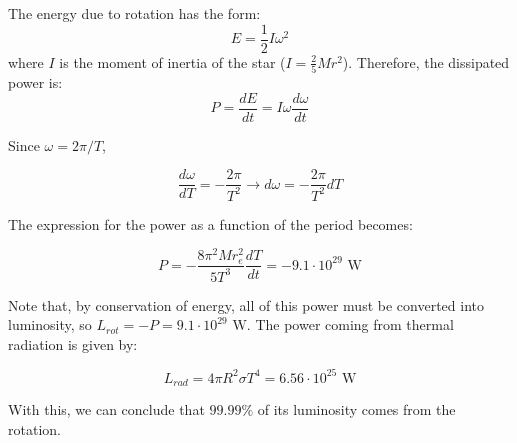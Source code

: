 \documentclass[11pt]{article}
\begin{document}
\begin{pproblem}
\begin{pssolution*}{}{}
\begin{alternativas}
            \item The energy due to rotation has the form:
            \[E = \frac{1}{2}I\omega^2\]
            where \(I\) is the moment of inertia of the star (\(I = \frac{2}{5}Mr^2\)). Therefore, the dissipated power is:
            \[P = \frac{dE}{dt} = I\omega\frac{d\omega}{dt}\]

            Since \(\omega = 2\pi/T\),

            \[\frac{d\omega}{dT} = -\frac{2\pi}{T^2} \rightarrow d\omega = -\frac{2\pi}{T^2}dT\]
            
            The expression for the power as a function of the period becomes:

            \[P = -\frac{8\pi^2Mr_e^2}{5T^3}\frac{dT}{dt} = -9.1\cdot10^{29} \text{ W}\]

            Note that, by conservation of energy, all of this power must be converted into luminosity, so \(L_{rot} = -P = 9.1\cdot10^{29}\text{ W}\). The power coming from thermal radiation is given by:

            \[L_{rad} = 4\pi R^2\sigma T^4 = 6.56 \cdot 10^{25}\text{ W}\]

            With this, we can conclude that \(99.99\%\) of its luminosity comes from the rotation.
        \end{alternativas}
    \end{pssolution*}    
\end{pproblem}
\end{document}
